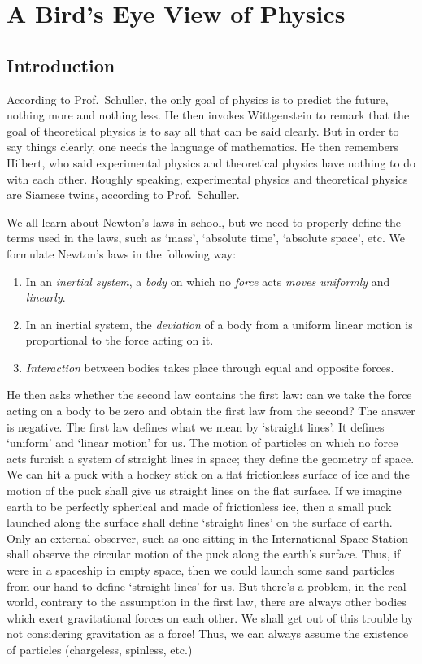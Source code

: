 \documentclass[a4 paper, 11pt]{book}
\theoremstyle{definition}
\begin{document}
    \mainmatter

    \chapter{A Bird's Eye View of Physics}

    \section{Introduction}

    According to Prof.\ Schuller, the only goal of physics is to predict the future, nothing more and nothing less. He then invokes Wittgenstein to remark that the goal of theoretical physics is to say all that can be said clearly. But in order to say things clearly, one needs the language of mathematics. He then remembers Hilbert, who said experimental physics and theoretical physics have nothing to do with each other. Roughly speaking, experimental physics and theoretical physics are Siamese twins, according to Prof.\ Schuller.

    We all learn about Newton's laws in school, but we need to properly define the terms used in the laws, such as `mass', `absolute time', `absolute space', etc. We formulate Newton's laws in the following way:
    \begin{enumerate}
        \item In an \textit{inertial system}, a \textit{body} on which no \textit{force} acts \textit{moves uniformly} and \textit{linearly}.
        \item In an inertial system, the \textit{deviation} of a body from a uniform linear motion is proportional to the force acting on it.
        \item \textit{Interaction} between bodies takes place through equal and opposite forces.
    \end{enumerate}
    He then asks whether the second law contains the first law: can we take the force acting on a body to be zero and obtain the first law from the second? The answer is negative. The first law defines what we mean by `straight lines'. It defines `uniform' and `linear motion' for us. The motion of particles on which no force acts furnish a system of straight lines in space; they define the geometry of space. We  can hit a puck with a hockey stick on a flat frictionless surface of ice and the motion of the puck shall give us straight lines on the flat surface. If we imagine earth to be perfectly spherical and made of frictionless ice, then a small puck launched along the surface shall define `straight lines' on the surface of earth. Only an external observer, such as one sitting in the International Space Station shall observe the circular motion of the puck along the earth's surface. Thus, if were in a spaceship in empty space, then we could launch some sand particles from our hand to define `straight lines' for us. But there's a problem, in the real world, contrary to the assumption in the first law, there are always other bodies which exert gravitational forces on each other. We shall get out of this trouble by not considering gravitation as a force! Thus, we can always assume the existence of particles (chargeless, spinless, etc.)
\end{document}

